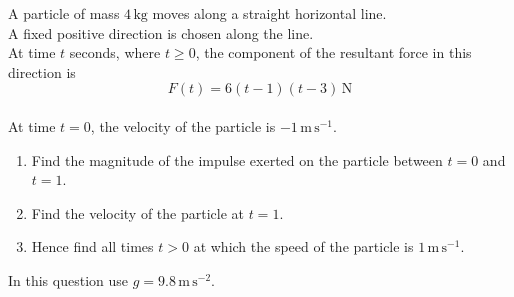 \documentclass[leqno]{article}
\begin{document}
\begin{enumerate}[
  label=\textbf{\arabic*.},
  leftmargin=*,
  topsep=0pt,
  partopsep=0pt,
  parsep=0pt
]
\questionitem

A particle of mass $4\,\mathrm{kg}$ moves along a straight horizontal line. \\
A fixed positive direction is chosen along the line. \\
At time $t$ seconds, where $t\geq 0$, the component of the resultant force in this direction is
\[
F(t)=6(t-1)(t-3)\,\mathrm{N}
\] \\
At time $t=0$, the velocity of the particle is $-1\,\mathrm{m\,s^{-1}}$. \\
\begin{enumerate}[label=\textbf{(\alph*)}]
\item Find the magnitude of the impulse exerted on the particle between $t=0$ and $t=1$.  \\
\item Find the velocity of the particle at $t=1$.  \\
\item Hence find all times $t>0$ at which the speed of the particle is $1\,\mathrm{m\,s^{-1}}$.  \\
\end{enumerate}

\newpage

\questionitem

In this question use $g=9.8\,\mathrm{m\,s^{-2}}$. \\


\end{enumerate}
\end{document}
